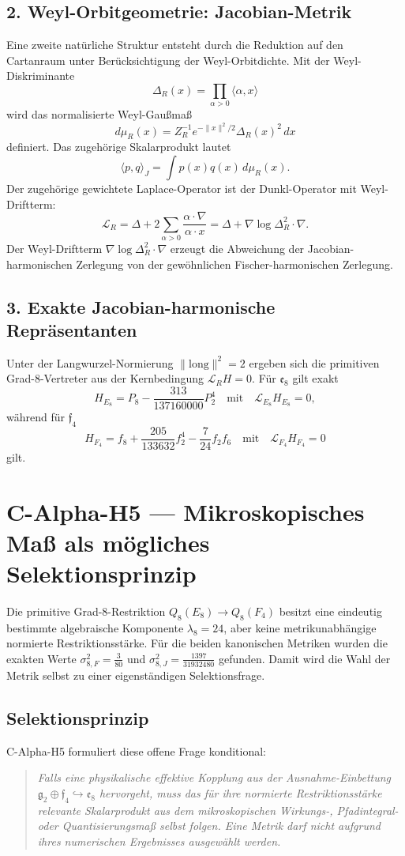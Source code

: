 \documentclass[11pt,a4paper]{article}
\begin{document}
\subsection{2. Weyl-Orbitgeometrie: Jacobian-Metrik}
Eine zweite natürliche Struktur entsteht durch die Reduktion auf den Cartanraum unter Berücksichtigung der Weyl-Orbitdichte. Mit der Weyl-Diskriminante
$$\Delta_R(x) = \prod_{\alpha > 0} \langle \alpha, x \rangle$$
wird das normalisierte Weyl-Gaußmaß
$$d\mu_R(x) = Z_R^{-1} e^{-\|x\|^2/2} \Delta_R(x)^2 \, dx$$
definiert. Das zugehörige Skalarprodukt lautet
$$\langle p, q \rangle_J = \int p(x)q(x) \, d\mu_R(x).$$
Der zugehörige gewichtete Laplace-Operator ist der Dunkl-Operator mit Weyl-Driftterm:
$$\mathcal{L}_R = \Delta + 2 \sum_{\alpha > 0} \frac{\alpha \cdot \nabla}{\alpha \cdot x} = \Delta + \nabla \log \Delta_R^2 \cdot \nabla.$$
Der Weyl-Driftterm $\nabla \log \Delta_R^2 \cdot \nabla$ erzeugt die Abweichung der Jacobian-harmonischen Zerlegung von der gewöhnlichen Fischer-harmonischen Zerlegung.

\subsection{3. Exakte Jacobian-harmonische Repräsentanten}
Unter der Langwurzel-Normierung $\|\text{long}\|^2 = 2$ ergeben sich die primitiven Grad-8-Vertreter aus der Kernbedingung $\mathcal{L}_R H = 0$. Für $\mathfrak{e}_8$ gilt exakt
$$H_{E_8} = P_8 - \frac{313}{137160000} P_2^4 \quad \text{mit} \quad \mathcal{L}_{E_8} H_{E_8} = 0,$$
während für $\mathfrak{f}_4$
$$H_{F_4} = f_8 + \frac{205}{133632} f_2^4 - \frac{7}{24} f_2 f_6 \quad \text{mit} \quad \mathcal{L}_{F_4} H_{F_4} = 0$$
gilt.

\section{C-Alpha-H5 — Mikroskopisches Maß als mögliches Selektionsprinzip}

Die primitive Grad-8-Restriktion $Q_8(E_8) \longrightarrow Q_8(F_4)$ besitzt eine eindeutig bestimmte algebraische Komponente $\lambda_8 = 24$, aber keine metrikunabhängige normierte Restriktionsstärke. Für die beiden kanonischen Metriken wurden die exakten Werte $\sigma_{8,F}^2 = \frac{3}{80}$ und $\sigma_{8,J}^2 = \frac{1397}{31932480}$ gefunden. Damit wird die Wahl der Metrik selbst zu einer eigenständigen Selektionsfrage.

\subsection*{Selektionsprinzip}
C-Alpha-H5 formuliert diese offene Frage konditional:
\begin{quote}
\textit{Falls eine physikalische effektive Kopplung aus der Ausnahme-Einbettung $\mathfrak{g}_2 \oplus \mathfrak{f}_4 \hookrightarrow \mathfrak{e}_8$ hervorgeht, muss das für ihre normierte Restriktionsstärke relevante Skalarprodukt aus dem mikroskopischen Wirkungs-, Pfadintegral- oder Quantisierungsmaß selbst folgen. Eine Metrik darf nicht aufgrund ihres numerischen Ergebnisses ausgewählt werden.}
\end{quote}
\end{document}
